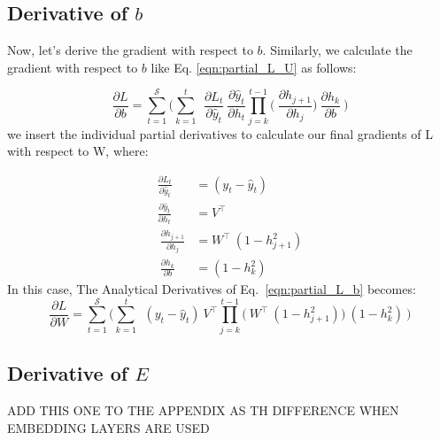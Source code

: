 \documentclass{article}
\begin{document}
\subsection{Derivative of $b$}
Now, let's derive the gradient with respect to $b$. Similarly, we calculate the gradient with respect to $b$  like Eq. \eqref{eqn:partial_L_U}  as follows:

\begin{equation}
	\frac{\partial L}{ \partial{b}} = \sum_{t=1}^{\mathcal{S}} 
	\bigg(	
	 \sum_{k=1}^{t} ~
	~\frac{\partial L_t}{\partial \hat{y}_t}
	~\frac{\partial \hat{y}_t}{\partial h_t}
        \prod_{j=k}^{t-1} \bigg(
	~\frac{\partial h_{j+1}}{\partial h_{j}}
        \bigg)
	~\frac{\partial h_k}{\partial b}~
	\bigg) 
 \label{eqn:partial_L_b}
\end{equation}
we insert the individual partial derivatives to calculate our final gradients of L with respect to W, where:

\begin{align*}
        \frac{\partial L_t}{\partial \hat{y}_t} &= (y_t - \hat{y}_t)\\
        \frac{\partial \hat{y}_t}{\partial h_t}
        &= V^\top \\
        ~\frac{\partial h_{j+1}}{\partial h_{j}}
        &= W^\top ~ (1 - h_{j+1}^2) \\
        ~\frac{\partial h_k}{\partial b}&= (1-h_k^2)
\end{align*}
In this case, The Analytical Derivatives of Eq.~\eqref{eqn:partial_L_b} becomes:
\begin{equation}
	\frac{\partial L}{ \partial{W}} = \sum_{t=1}^{\mathcal{S}} 
	\bigg(	
	 \sum_{k=1}^{t} ~
	~(y_t - \hat{y}_t)
	~V^\top
        \prod_{j=k}^{t-1} \bigg(
	~W^\top ~ (1 - h_{j+1}^2)
        \bigg)
	~(1-h_k^2)~
	\bigg) 
 \label{eqn:partial_L_ab}
\end{equation}

\subsection{Derivative of $E$}

ADD THIS ONE TO THE APPENDIX AS TH DIFFERENCE WHEN EMBEDDING LAYERS ARE USED
\end{document}
